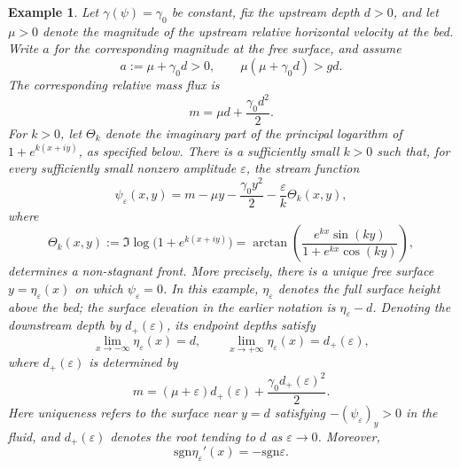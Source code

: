 \documentclass[12pt,letterpaper]{amsart}
\newtheorem{example}[theorem]{Example}
\numberwithin{equation}{section}
\def\sgn{\mathrm{sgn}}
\begin{document}
	\begin{example}\label{lem:explicit-front}
		{Let $\gamma(\psi)=\gamma_0$ be constant, fix the upstream depth $d>0$, and let $\mu>0$ denote the magnitude of the upstream relative horizontal velocity at the bed. Write $a$ for the corresponding magnitude at the free surface, and assume}
		\begin{equation}\label{eq:explicit-supercritical}
			a:=\mu+\gamma_0d>0,
			\qquad
			\mu(\mu+\gamma_0d)>gd.
		\end{equation}
		{The corresponding relative mass flux is}
		\begin{equation*}
			m=\mu d+\frac{\gamma_0d^2}{2}.
		\end{equation*}
		{For $k>0$, let $\Theta_k$ denote the imaginary part of the principal logarithm of $1+e^{k(x+iy)}$, as specified below. There is a sufficiently small $k>0$ such that, for every sufficiently small nonzero amplitude $\varepsilon$, the stream function}
		\begin{equation}\label{eq:explicit-stream}
			\psi_\varepsilon(x,y)
			=m-\mu y-\frac{\gamma_0y^2}{2}
			-\frac{\varepsilon}{k}\Theta_k(x,y),
		\end{equation}
		where
		\begin{equation}\label{eq:explicit-theta}
			\Theta_k(x,y)
			:=\Im\log\bigl(1+e^{k(x+iy)}\bigr)
			=\arctan\left(\frac{e^{kx}\sin(ky)}
			{1+e^{kx}\cos(ky)}\right),
		\end{equation}
		determines a non-stagnant front.  More precisely, there is a unique
		{free surface $y=\eta_\varepsilon(x)$ on which $\psi_\varepsilon=0$. In this example, $\eta_\varepsilon$ denotes the full surface height above the bed; the surface elevation in the earlier notation is $\eta_\varepsilon-d$. Denoting the downstream depth by $d_+(\varepsilon)$, its endpoint depths satisfy}
		\begin{equation}\label{eq:explicit-depth-limits}
			\lim_{x\to-\infty}\eta_\varepsilon(x)=d,
			\qquad
			\lim_{x\to+\infty}\eta_\varepsilon(x)=d_+(\varepsilon),
		\end{equation}
		where $d_+(\varepsilon)$ is determined by
		\begin{equation}\label{eq:explicit-downstream-depth}
			m=(\mu+\varepsilon)d_+(\varepsilon)
			+\frac{\gamma_0d_+(\varepsilon)^2}{2}.
		\end{equation}
Here uniqueness refers to the surface near $y=d$ satisfying $-(\psi_\varepsilon)_y>0$ in the fluid, and $d_+(\varepsilon)$ denotes the root tending to $d$ as $\varepsilon\to0$.
		Moreover,
		\begin{equation}\label{eq:explicit-monotone-surface}
			\sgn \eta_\varepsilon'(x)=-\sgn\varepsilon.
		\end{equation}
		

\end{example}
\end{document}
